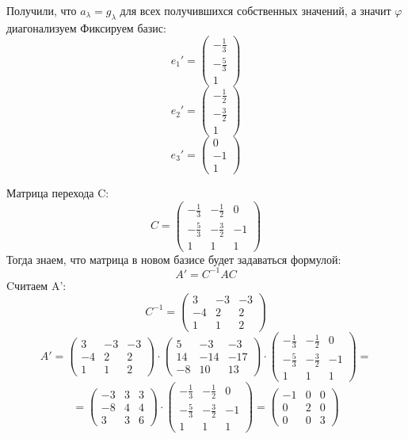 \documentclass[a4paper,12pt]{article}
\begin{document}
Получили, что $a_{\lambda} = g_{\lambda}$ для всех получившихся собственных значений, а значит $\varphi$ диагонализуем
\clearpage
Фиксируем базис:
\[
e_1' = 
\begin{pmatrix}
-\frac13 \\-\frac53 \\ 1
\end{pmatrix}
\]
\[
e_2' = 
\begin{pmatrix}
-\frac12 \\ -\frac32 \\ 1
\end{pmatrix}
\]
\[
e_3' =
\begin{pmatrix}
0 \\ -1 \\ 1
\end{pmatrix}
\]

Матрица перехода C:
\[
C = \begin{pmatrix}
-\frac13 & -\frac12 & 0 \\
-\frac53 & -\frac32 & -1 \\
1 & 1 & 1
\end{pmatrix}
\]
Тогда знаем, что матрица в новом базисе будет задаваться формулой:
\[
A' = C^{-1}AC 
\]
Cчитаем A':
\[
C^{-1} = \begin{pmatrix}
3 & -3 & -3 \\
-4 & 2 & 2 \\
1 & 1 & 2
\end{pmatrix}
\]
\[
A' = \begin{pmatrix}
3 & -3 & -3 \\
-4 & 2 & 2 \\
1 & 1 & 2
\end{pmatrix} \cdot \begin{pmatrix}
5 & -3 & -3 \\
14 & -14 & -17 \\
-8 & 10 & 13
\end{pmatrix} \cdot \begin{pmatrix}
-\frac13 & -\frac12 & 0 \\
-\frac53 & -\frac32 & -1 \\
1 & 1 & 1
\end{pmatrix} =
\]
\[
=
\left(\begin{matrix}
-3 & 3 & 3 \\
-8 & 4 & 4 \\
3 & 3 & 6
\end{matrix}\right) \cdot \begin{pmatrix}
-\frac13 & -\frac12 & 0 \\
-\frac53 & -\frac32 & -1 \\
1 & 1 & 1
\end{pmatrix} = \left(\begin{matrix}
-1 & 0 & 0 \\
0 & 2 & 0 \\
0 & 0 & 3
\end{matrix}\right)
\]
\end{document}
